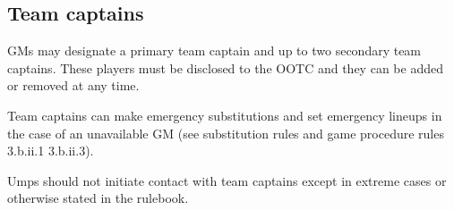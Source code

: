 \subsection{Team captains}
\begin{deepEnumerate}
      \item GMs may designate a primary team captain and up to two secondary team captains.
            These players must be disclosed to the OOTC and they can be added or removed at any time.
      \item Team captains can make emergency substitutions and set emergency lineups
            in the case of an unavailable GM
            (see substitution rules and game procedure rules 3.b.ii.1 3.b.ii.3). %
            \begin{deepEnumerate}
                  \item Umps should not initiate contact with team captains
                        except in extreme cases or otherwise stated in the rulebook.
            \end{deepEnumerate}
\end{deepEnumerate}
